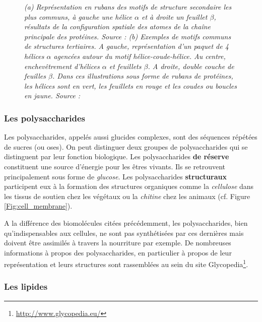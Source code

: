 \begin{figure}[h]
  \caption[(a) Représentation en rubans des motifs de structure secondaire. (b) Exemples de motifs communs de structures tertiaires.]{\it (a) Représentation en rubans des motifs de structure secondaire les plus communs, à gauche une hélice $\alpha$ et à droite un feuillet $\beta$, résultats de la configuration spatiale des atomes de la chaîne principale des protéines. Source : \cite{alberts2013essential}
  (b) Exemples de motifs communs de structures tertiaires. A gauche, représentation d'un paquet de 4 hélices $\alpha$ agencées autour du motif hélice-coude-hélice. Au centre, enchevêtrement d'hélices $\alpha$ et feuillets $\beta$. A droite, double couche de feuilles $\beta$. Dans ces illustrations sous forme de rubans de protéines, les hélices sont en vert, les feuillets en rouge et les coudes ou boucles en jaune. Source : \cite{alberts2013essential}
  }
\end{figure}

\subsubsection{Les polysaccharides}

Les polysaccharides, appelés aussi glucides complexes, sont des séquences répétées de sucres (ou oses). On peut distinguer deux groupes de polysaccharides qui se distinguent par leur fonction biologique. Les polysaccharides \textbf{de réserve} constituent une source d'énergie pour les êtres vivants. Ils se retrouvent principalement sous forme de \textit{glucose}.
Les polysaccharides \textbf{structuraux} participent eux à la formation des structures organiques comme la \textit{cellulose} dans les tissus de soutien chez les végétaux ou la \textit{chitine} chez les animaux (cf. Figure \ref{Fig:cell_membrane}).

A la différence des biomolécules citées précédemment, les polysaccharides, bien qu'indispensables aux cellules, ne sont pas synthétisées par ces dernières mais doivent être assimilés à travers la nourriture par exemple. De nombreuses informations à propos des polysaccharides, en particulier à propos de leur représentation et leurs structures sont rassemblées au sein du site Glycopedia\footnote{\url{http://www.glycopedia.eu/}}.

\subsubsection{Les lipides}

